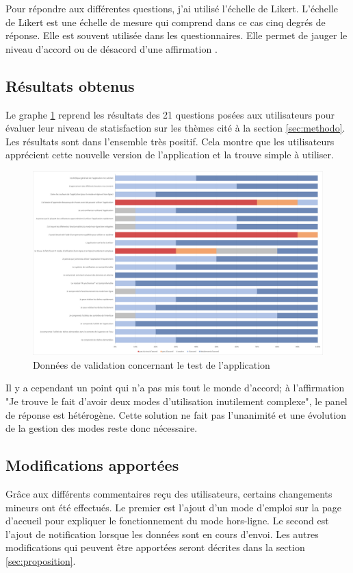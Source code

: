 \documentclass{EPL-master-thesis-covers-FR}
\begin{document}
				Pour répondre aux différentes questions, j'ai utilisé l'échelle de Likert. L'échelle de Likert est une échelle de mesure qui comprend dans ce cas cinq degrés de réponse. Elle est souvent utilisée dans les questionnaires. Elle permet de jauger le niveau d'accord ou de désacord d'une affirmation \cite{ref:likert}.
				
	
			\subsection*{Résultats obtenus}
				Le graphe \ref{fig:validation} reprend les résultats des 21 questions posées aux utilisateurs pour évaluer leur niveau de statisfaction sur les thèmes cité à la section \ref{sec:methodo}. Les résultats sont dans l'ensemble très positif. Cela montre que les utilisateurs apprécient cette nouvelle version de l'application et la trouve simple à utiliser. 
			
				\begin{figure}[H]
					\centering
					\includegraphics[width=1\textwidth]{images/validation}
					\caption{Données de validation concernant le test de l'application}
					\label{fig:validation}
				\end{figure}
		
				Il y a cependant un point qui n'a pas mis tout le monde d'accord; à l'affirmation "Je trouve le fait d'avoir deux modes d'utilisation inutilement complexe", le panel de réponse est hétérogène. Cette solution ne fait pas l'unanimité et une évolution de la gestion des modes reste donc nécessaire.
		
			\subsection*{Modifications apportées}
				Grâce aux différents commentaires reçu des utilisateurs, certains changements mineurs ont été effectués. Le premier est l'ajout d'un mode d'emploi sur la page d'accueil pour expliquer le fonctionnement du mode hors-ligne.
				Le second est l'ajout de notification lorsque les données sont en cours d'envoi. 
				Les autres modifications qui peuvent être apportées seront décrites dans la section \ref{sec:proposition}.
				
\end{document}

